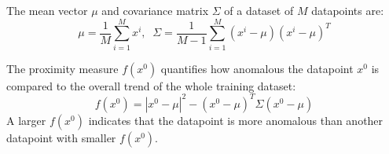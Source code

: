 The mean vector $\mu$ and covariance matrix $\Sigma$ of a dataset of $M$ datapoints are:
\begin{equation}
    \mu = \frac{1}{M} \sum^M_{i=1}x^i ,\;\;
    \Sigma = \frac{1}{M-1} \sum^M_{i=1} (x^i - \mu) (x^i-\mu)^T
    \label{eqn: mean vector, covariance matrix}
\end{equation}

The proximity measure $f(x^0)$ quantifies how anomalous the datapoint $x^0$ is compared to the overall trend of the whole training dataset:
\begin{equation}
    f(x^0) = \left| x^0 - \mu \right|^2 - \left( x^0 - \mu \right)^T \Sigma\left( x^0 - \mu \right)
\end{equation}
A larger $f(x^0)$ indicates that the datapoint is more anomalous than another datapoint with smaller $f(x^0)$.